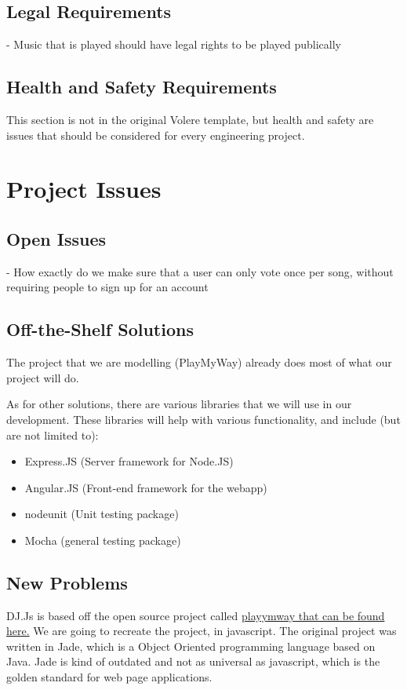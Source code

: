 \documentclass[12pt, titlepage]{article}
\begin{document}
\subsection{Legal Requirements}
- Music that is played should have legal rights to be played publically \\
\subsection{Health and Safety Requirements}

This section is not in the original Volere template, but health and safety are
issues that should be considered for every engineering project.

\section{Project Issues}

\subsection{Open Issues}

- How exactly do we make sure that a user can only vote once per song, without
  requiring people to sign up for an account \\

\subsection{Off-the-Shelf Solutions}

The project that we are modelling (PlayMyWay) already does most of what our
project will do.

As for other solutions, there are various libraries that we will use in our
development. These libraries will help with various functionality, and include
(but are not limited to):
\begin{itemize}
\item Express.JS (Server framework for Node.JS)
\item Angular.JS (Front-end framework for the webapp)
\item nodeunit (Unit testing package)
\item Mocha (general testing package)
\end{itemize}

\subsection{New Problems}
DJ.Js is based off the open source project called \href{https://github.com/malithsen/playmyway}{playymway that can be found here.} We are going to recreate the project, in javascript. The original project was written in Jade, which is a Object Oriented programming language based on Java. Jade is kind of outdated and not as universal as javascript, which is the golden standard for web page applications.
\end{document}
